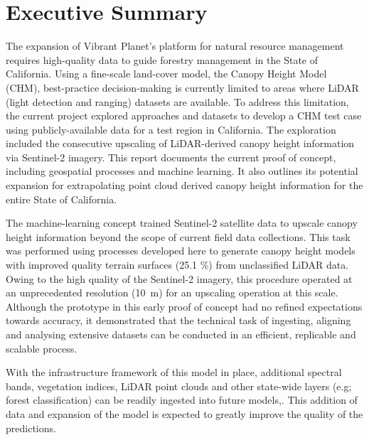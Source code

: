 \section*{Executive Summary}

The expansion of Vibrant Planet's platform for natural resource management requires high-quality data to guide forestry management in the State of California. Using a fine-scale land-cover model, the Canopy Height Model (CHM), best-practice decision-making is currently limited to areas where LiDAR (light detection and ranging) datasets are available. 
To address this limitation, the current project explored approaches and datasets to develop a CHM test case using publicly-available data for a test region
in California.  The exploration included the consecutive upscaling of LiDAR-derived canopy height information via Sentinel-2 imagery. This report documents the current
 proof of concept, including geospatial processes and machine learning. It also outlines its potential expansion for extrapolating point cloud derived canopy height information for the entire State of California.

 The machine-learning concept trained Sentinel-2 satellite data to upscale canopy height information beyond the 
 scope of current field data collections. This task was performed using processes developed here to generate 
 canopy height models with improved quality terrain surfaces (25.1 \%) from unclassified LiDAR data. Owing to the high quality 
 of the Sentinel-2 imagery, this procedure operated at an unprecedented resolution (10~m) for an upscaling operation at this scale.  
Although the prototype in this early proof of concept had no refined expectations towards accuracy, it demonstrated that the technical 
task of ingesting, aligning and analysing extensive datasets can be conducted in an efficient, replicable and scalable process. 

With the infrastructure framework of this model in place, additional spectral bands, vegetation indices, LiDAR point clouds and other state-wide layers 
(e.g; forest classification) can be readily ingested into future models,. This addition of data and expansion of the model is
expected to greatly improve the quality of the predictions.

%

